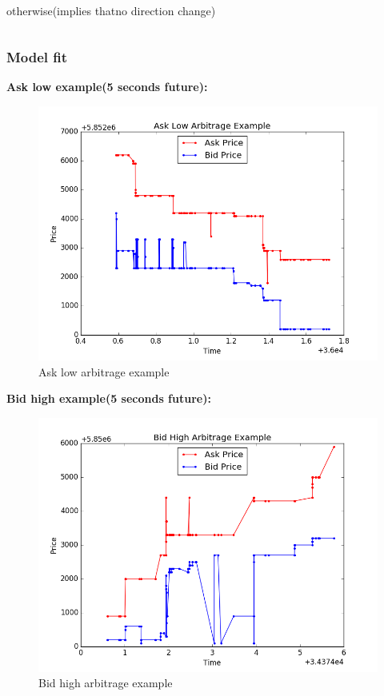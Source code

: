 \documentclass[xcolor={x11names,svgnames,dvipsnames}]{beamer}
\begin{document}
\begin{frame}
\begin{columns}
\begin{column}{.5\textwidth}
\begin{itemize}
			\\
			\subitem\textbullet  otherwise(implies that\alert{no direction} change)
			\end{itemize}
		\end{column}
	\end{columns}
\end{frame}


\begin{frame}
\frametitle{Model fit}
\textbf{Ask low example(5 seconds future):}
\begin{figure}
\centering
\includegraphics[width=0.7\linewidth]{./ask_low_example}
\caption{Ask low arbitrage example}
\label{fig:ask_low_example}
\end{figure}

\end{frame}

\begin{frame}

\textbf{Bid high example(5 seconds future):}
\begin{figure}
\centering
\includegraphics[width=0.7\linewidth]{./bid_high_example}
\caption{Bid high arbitrage example}
\label{fig:bid_low_example}
\end{figure}

\end{frame}
\end{document}
